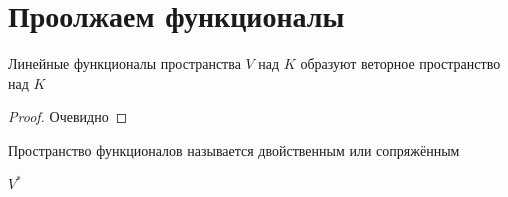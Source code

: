 \section{Проолжаем функционалы}

\begin{property}
	Линейные функционалы пространства $ V $ над $ K $ образуют веторное пространство над $ K $
\end{property}

\begin{proof}
	Очевидно
\end{proof}


\begin{definition}
	Пространство функционалов называется двойственным или сопряжённым
\end{definition}

\begin{notation}
	$ V^* $
\end{notation}

